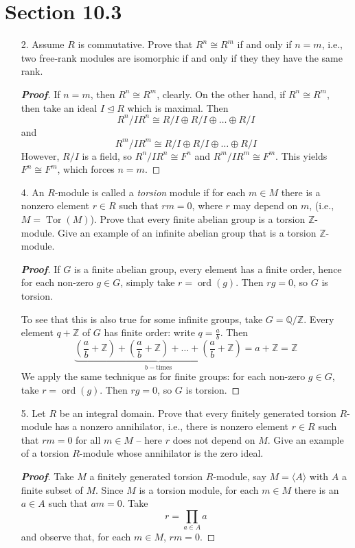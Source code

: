 \documentclass[12pt,leqno]{book}
\theoremstyle{definition}
\newcommand{\ord}{\operatorname{ord}}
\newcommand{\Tor}{\operatorname{Tor}}
\newcommand{\Z}{\mathbb{Z}}
\newcommand{\Q}{\mathbb{Q}}
\newenvironment{Proof}{\begin{proof}[\textnormal{\textbf{Proof}}]}{\end{proof}}
\begin{document}
\section*{Section 10.3}
\begin{enumerate}
 \item [2.] Assume $R$ is commutative. Prove that $R^n\cong R^m$ if and only if $n=m$, i.e., two free-rank modules are isomorphic if and only if they they have the same rank.

\begin{Proof}
 If $n=m$, then $R^n\cong R^m$, clearly. On the other hand, if $R^n\cong R^m$, then take an ideal $I\unlhd R$ which is maximal. Then \[R^n/IR^n\cong R/I\oplus R/I\oplus\hdots\oplus R/I\] and \[R^m/IR^m\cong R/I\oplus R/I\oplus\hdots\oplus R/I\] However, $R/I$ is a field, so $R^n/IR^n\cong F^n$ and $R^m/IR^m\cong F^m$. This yields $F^n\cong F^m$, which forces $n=m$.
\end{Proof}

 \item [4.] An $R$-module is called a \textit{torsion} module if for each $m\in M$ there is a nonzero element $r\in R$ such that $rm=0$, where $r$ may depend on $m$, (i.e., $M=\Tor(M)$). Prove that every finite abelian group is a torsion $\Z$-module. Give an example of an infinite abelian group that is a torsion $\Z$-module.

\begin{Proof}
 If $G$ is a finite abelian group, every element has a finite order, hence for each non-zero $g\in G$, simply take $r=\ord(g)$. Then $rg=0$, so $G$ is torsion.

To see that this is also true for some infinite groups, take $G=\Q/\Z$. Every element $q+\Z$ of $G$ has finite order: write $q=\frac{a}{b}$. Then \[\underbrace{\left(\frac{a}{b}+\Z\right)+\left(\frac{a}{b}+\Z\right)+\hdots+\left(\frac{a}{b}+\Z\right)}_{b-\text{times}}=a+\Z=\Z\] We apply the same technique as for finite groups: for each non-zero $g\in G$, take $r=\ord(g)$. Then $rg=0$, so $G$ is torsion.
\end{Proof}

 \item [5.] Let $R$ be an integral domain. Prove that every finitely generated torsion $R$-module has a nonzero annihilator, i.e., there is nonzero element $r\in R$ such that $rm=0$ for all $m\in M$ -- here $r$ does not depend on $M$. Give an example of a torsion $R$-module whose annihilator is the zero ideal.

\begin{Proof}
 Take $M$ a finitely generated torsion $R$-module, say $M=\langle A\rangle$ with $A$ a finite subset of $M$. Since $M$ is a torsion module, for each $m\in M$ there is an $a\in A$ such that $am=0$. Take \[r=\prod_{a\in A}a\] and observe that, for each $m\in M$, $rm=0$.


\end{Proof}
\end{enumerate}
\end{document}
